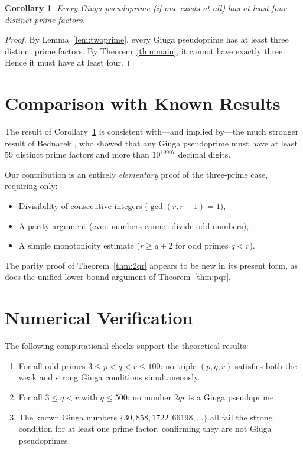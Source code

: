 \documentclass[12pt,a4paper]{amsart}
\newtheorem{corollary}[theorem]{Corollary}
\theoremstyle{definition}
\begin{document}
\begin{corollary}
\label{cor:fourprimes}
Every Giuga pseudoprime (if one exists at all) has at least \emph{four}
distinct prime factors.
\end{corollary}

\begin{proof}
By Lemma~\ref{lem:twoprime}, every Giuga pseudoprime has at least three
distinct prime factors.  By Theorem~\ref{thm:main}, it cannot have exactly
three.  Hence it must have at least four.
\end{proof}

\section{Comparison with Known Results}

The result of Corollary~\ref{cor:fourprimes} is consistent with—and implied
by—the much stronger result of Bednarek \cite{Bednarek2014}, who
showed that any Giuga pseudoprime must have at least~$59$ distinct prime
factors and more than $10^{19907}$ decimal digits.

Our contribution is an entirely \emph{elementary} proof of the three-prime
case, requiring only:
\begin{itemize}
  \item Divisibility of consecutive integers ($\gcd(r, r-1) = 1$),
  \item A parity argument (even numbers cannot divide odd numbers),
  \item A simple monotonicity estimate ($r \ge q + 2$ for odd primes $q < r$).
\end{itemize}

The parity proof of Theorem~\ref{thm:2qr} appears to be new in its
present form, as does the unified lower-bound argument of Theorem~\ref{thm:pqr}.

\section{Numerical Verification}

The following computational checks support the theoretical results:

\begin{enumerate}
  \item For all odd primes $3 \le p < q < r \le 100$: no triple $(p, q, r)$
        satisfies both the weak and strong Giuga conditions simultaneously.
  \item For all $3 \le q < r$ with $q \le 500$: no number $2qr$ is a
        Giuga pseudoprime.
  \item The known Giuga numbers $\{30, 858, 1722, 66198, \ldots\}$ all fail
        the strong condition for at least one prime factor, confirming they are
        not Giuga pseudoprimes.
\end{enumerate}
\end{document}
